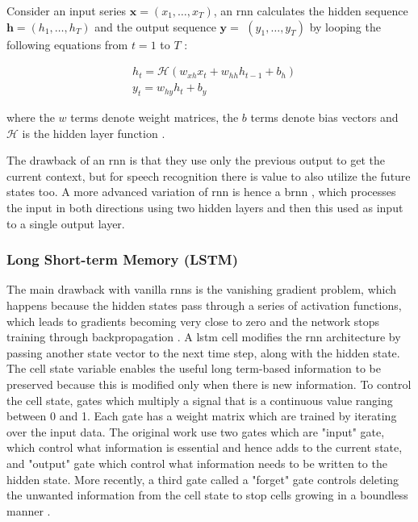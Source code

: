 Consider an input series $\boldsymbol{x}=\left(x_{1}, \ldots, x_{T}\right)$, an \acrshort{rnn} calculates the hidden sequence $\boldsymbol{h}=\left(h_{1}, \ldots, h_{T}\right)$ and the output sequence $\boldsymbol{y}=$ $\left(y_{1}, \ldots, y_{T}\right)$ by looping the following equations from $t=1$ to $T$ :

$$
\begin{aligned}
&h_{t}=\mathcal{H}\left(w_{xh} x_{t}+w_{hh} h_{t-1}+b_{h}\right) \\
&y_{t}=w_{h y} h_{t}+b_{y}
\end{aligned}
$$

where the $w$ terms denote weight matrices, the $b$ terms denote bias vectors and $\mathcal{H}$ is the hidden layer function \cite{Graves2013SpeechNetworks}.

The drawback of an \acrshort{rnn} is that they use only the previous output to get the current context, but for speech recognition there is value to also utilize the future states too. A more advanced variation of \acrshort{rnn} is hence a \acrfull{brnn} \cite{Schuster1997BidirectionalNetworks}, which processes the input in both directions using two hidden layers and then this used as input to a single output layer. 

\subsubsection{Long Short-term Memory (LSTM)}
The main drawback with vanilla \acrshort{rnn}s is the vanishing gradient problem, which happens because the hidden states pass through a series of  activation functions, which leads to gradients becoming very close to zero and the network stops training through backpropagation \cite{Hochreiter1997LongMemory}. A \acrfull{lstm} cell \cite{Hochreiter1997LongMemory} modifies the \acrshort{rnn} architecture by passing another state vector to the next time step, along with the hidden state. The cell state variable enables the useful long term-based information to be preserved because this is modified only when there is new information. To control the cell state, gates which multiply a signal that is a continuous value ranging between 0 and 1. Each gate has a weight matrix which are trained by iterating over the input data. The original work use two gates which are "input" gate, which control what information is essential and hence adds to the current state, and "output" gate which control what information needs to be written to the hidden state. More recently, a third gate called a "forget" gate controls deleting the unwanted information  from the cell state to stop cells growing in a boundless manner \cite{Gers2000LearningLSTM}.

